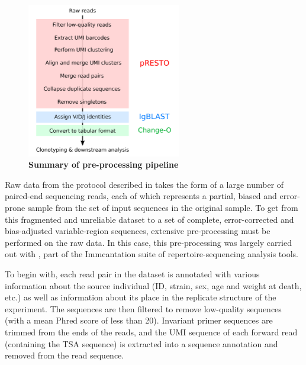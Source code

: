 \begin{figure}
\centering
\caption{\textbf{Summary of \igseq pre-processing pipeline}}
\label{fig:igrace-preprocessing}
\includegraphics[width=0.6\textwidth]{_Figures/png_edited/igseq-preprocessing}
\vspace{0.5em}
\end{figure}

Raw \igseq data from the protocol described in  takes the form of a large number of paired-end sequencing reads, each of which represents a partial, biased and error-prone sample from the set of input sequences in the original sample. To get from this fragmented and unreliable dataset to a set of complete, error-corrected and bias-adjusted \igh{} variable-region sequences, extensive pre-processing must be performed on the raw data. In this case, this pre-processing was largely carried out with  \parencite{vanderheiden2014presto}, part of the Immcantation suite of repertoire-sequencing analysis tools. %

To begin with, each read pair in the dataset is annotated with various information about the source individual (ID, strain, sex, age and weight at death, etc.) as well as information about its place in the replicate structure of the experiment. The sequences are then filtered to remove low-quality sequences (with a mean Phred score of less than 20). Invariant primer sequences are trimmed from the ends of the reads, and the UMI sequence of each forward read (containing the TSA sequence) is extracted into a sequence annotation and removed from the read sequence.


